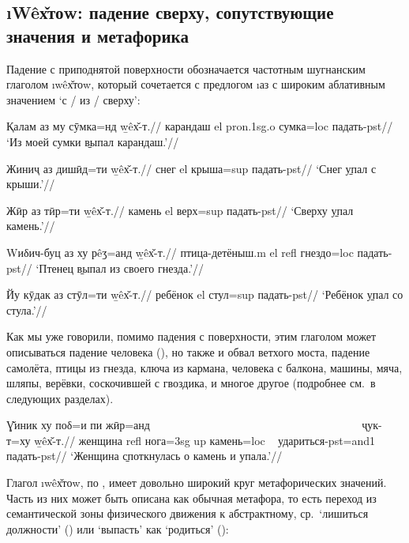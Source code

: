 \subsection{\i{Wêх̌тоw}: падение сверху, сопутствующие значения и метафорика} \label{down-wextow}

Падение с приподнятой поверхности обозначается частотным шугнанским глаголом \i{wêх̌тоw}, который сочетается с предлогом \i{аз} с широким аблативным значением ‘с / из / сверху’:

\begingl
\gla Қалам аз му сӯмка=нд \b{wêх̌-т}.//
\glc карандаш {\sc el} {\sc pron.1sg.o} сумка={\sc loc} падать-{\sc pst}//
\glft ‘Из моей сумки \b{выпал} карандаш.’//
\endgl \xe

\begingl
\gla Жиниҷ аз дишӣд=ти \b{wêх̌-т}.//
\glc снег {\sc el} крыша={\sc sup} падать-{\sc pst}//
\glft ‘Снег \b{упал} с крыши.’//
\endgl \xe

\begingl
\gla Жӣр аз тӣр=ти \b{wêх̌-т}.//
\glc камень {\sc el} верх={\sc sup} падать-{\sc pst}//
\glft ‘Сверху \b{упал} камень.’//
\endgl \xe

\begingl
\gla Wиδич-буц аз ху рêӡ=анд \b{wêх̌-т}.//
\glc птица-детёныш.{\sc m} {\sc el} {\sc refl} гнездо={\sc loc} падать-{\sc pst}//
\glft ‘Птенец \b{выпал} из своего гнезда.’//
\endgl \xe

\begingl
\gla Йу кӯдак аз стӯл=ти \b{wêх̌-т}.//
 ребёнок {\sc el} стул={\sc sup} падать-{\sc pst}//
\glft ‘Ребёнок \b{упал} со стула.’//
\endgl \xe

Как мы уже говорили, помимо падения с поверхности, этим глаголом может описываться падение человека (), но также и обвал ветхого моста, падение самолёта, птицы из гнезда, ключа из кармана, человека с балкона, машины, мяча, шляпы, верёвки, соскочившей с гвоздика, и многое другое (подробнее см.~в следующих разделах).

\begingl
\gla Ɣ̌иник ху поδ=и пи жӣр=анд ~~~~~~~~~~~~~~~~~~~~~~~~~~~~~~~~~~~~~ ҷук-т=ху \b{wêх̌-т}.//
\glc женщина {\sc refl} нога={\sc 3sg} {\sc up} камень={\sc loc} ~ удариться-{\sc pst=and1} падать-{\sc pst}//
\glft ‘Женщина \b{споткнулась} о камень и упала.’//
\endgl \xe

Глагол \i{wêх̌тоw}, по \parencite[360–361]{karamshoev1988}, имеет довольно широкий круг метафорических значений. Часть из них может быть описана как обычная метафора, то есть переход из семантической зоны физического движения к абстрактному, ср.~‘лишиться должности’ () или ‘выпасть’ как ‘родиться’ ():


